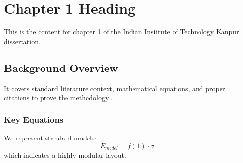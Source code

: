 \chapter{Chapter 1 Heading}
\label{ch:chapter1}
This is the content for chapter 1 of the Indian Institute of Technology Kanpur dissertation.

\section{Background Overview}
It covers standard literature context, mathematical equations, and proper citations to prove the methodology \cite{texbook}.

\subsection{Key Equations}
We represent standard models:
\begin{equation}
    E_{model} = f(1) \cdot \sigma
\end{equation}
which indicates a highly modular layout.
